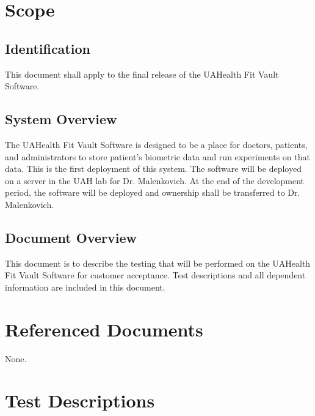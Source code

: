 \documentclass[letterpaper,10pt,english]{sphinxmanual}
\begin{document}
\section{Scope}
\label{STD/software_test_description:scope}

\subsection{Identification}
\label{STD/software_test_description:identification}
This document shall apply to the final release of the UAHealth Fit Vault Software.


\subsection{System Overview}
\label{STD/software_test_description:system-overview}
The UAHealth Fit Vault Software is designed to be a place for doctors, patients, and administrators to store patient’s
biometric data and run experiments on that data. This is the first deployment of this system.
The software will be deployed on a server in the UAH lab for Dr. Malenkovich. At the end of the development period,
the software will be deployed and ownership shall be transferred to Dr. Malenkovich.


\subsection{Document Overview}
\label{STD/software_test_description:document-overview}
This document is to describe the testing that will be performed on the UAHealth Fit Vault Software for customer acceptance.
Test descriptions and all dependent information are included in this document.


\section{Referenced Documents}
\label{STD/software_test_description:referenced-documents}
None.


\section{Test Descriptions}
\label{STD/software_test_description:test-descriptions}
\end{document}
